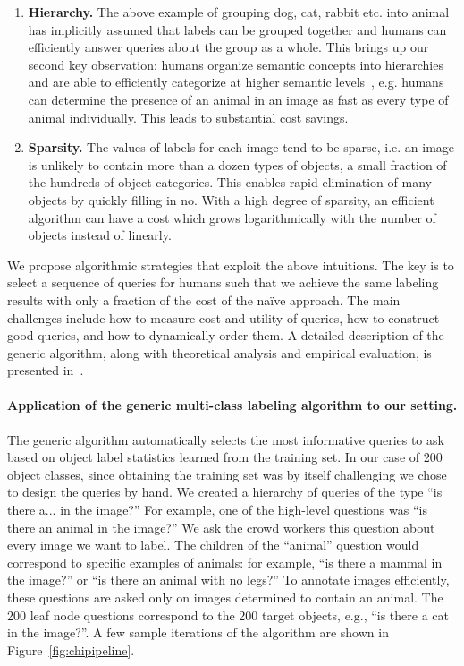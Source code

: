 \begin{table}
\begin{enumerate}
\item {\bf Hierarchy.} The above example of grouping dog, cat, rabbit etc. into animal has implicitly assumed that labels can be
grouped together and humans can efficiently answer queries about the group as a whole. This brings up our second key observation: humans organize semantic concepts into hierarchies and are able to efficiently categorize at higher semantic levels~\citep{Thorpe96}, e.g. humans can determine the presence of an animal in an image as fast as every type of animal individually. This leads to substantial cost savings.

\item {\bf Sparsity.} The values of labels for each image tend to be sparse, i.e. an image is unlikely to contain more than a dozen types of objects, a small fraction of the hundreds of object categories. This enables rapid elimination of many objects by quickly filling in no. With a high degree of sparsity, an efficient algorithm can have a cost which grows logarithmically with the number of objects instead of linearly.
\end{enumerate}



We propose algorithmic strategies that exploit the above intuitions. The key is to select a sequence of queries for humans such that we achieve the same labeling results with only a fraction of the cost of the na\"ive approach. The main challenges include how to measure cost and utility of queries, how to construct good queries, and how to dynamically order them. A detailed description of the generic algorithm, along with theoretical analysis and empirical evaluation, is presented in~\citep{Deng14}.  



\paragraph{Application of the generic multi-class labeling algorithm to our setting.}
The generic algorithm automatically selects the most informative queries to ask based on object label statistics learned from the training set.
In our case of 200 object classes, since obtaining the training set was by itself challenging we chose to design the queries by hand.
We created a hierarchy of queries of the type ``is there a... in the image?'' For example, one of the high-level questions was ``is there an animal in the image?'' We ask the crowd workers this question about every image we want to label. 
The children of the ``animal'' question would correspond to specific examples of animals: for example, ``is there a mammal in the image?'' or ``is there an animal with no legs?'' To annotate images efficiently, these questions are asked only on images determined to contain an animal.
The 200 leaf node questions correspond to the 200 target objects, e.g., ``is there a cat in the image?''. A few sample iterations of the algorithm are shown in Figure~\ref{fig:chipipeline}. 


\end{table}
